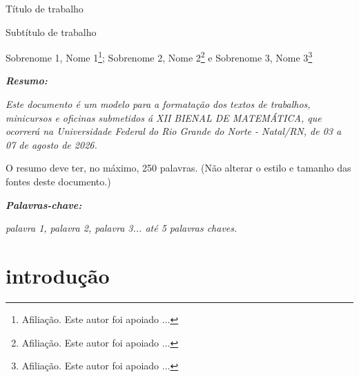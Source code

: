 \documentclass[12pt,oneside,a4paper]{article}
\begin{document}
\begin{center}
{\Huge\bf

       T\'itulo de trabalho%

}\end{center}

\begin{center}
	{\large\bf
		
		Subt\'itulo de trabalho%
		
}\end{center}

\begin{center}
{\large

 Sobrenome 1, Nome 1\footnote{Afilia\c{c}\~ao. Este autor foi apoiado ...};
 Sobrenome 2, Nome 2\footnote{Afilia\c{c}\~ao. Este autor foi apoiado ...} e
 Sobrenome 3, Nome 3\footnote{Afilia\c{c}\~ao. Este autor foi apoiado ...}

}\end{center}


\noindent \textit{\textbf{Resumo:}}{\it 
  Este documento \'e um modelo para a formata\c{c}\~ao dos textos de trabalhos, minicursos e oficinas submetidos \'a XII BIENAL DE MATEM\'ATICA, que ocorrer\'a na Universidade Federal do  Rio Grande do Norte - Natal/RN, de 03 a 07 de agosto de 2026. 

O resumo deve ter, no m\'aximo, 250 palavras. (N\~ao alterar o estilo e tamanho das fontes deste documento.)
}

\begin{flushleft}
\textit{\textbf{Palavras-chave:}}{\it
palavra 1, palavra 2, palavra 3...  at\'e 5 palavras chaves.

}\end{flushleft}

 



\section{\sc introdu\c{c}\~ao}
\end{document}

